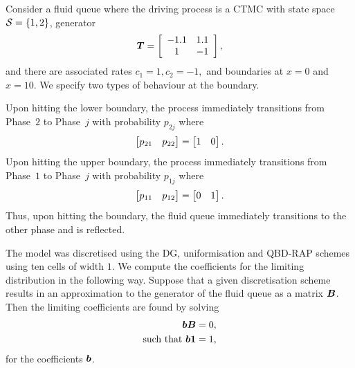 \begin{model}\label{model: simple}
	Consider a fluid queue where the driving process is a CTMC with state space \(\mathcal{S}=\{1,2\}\), generator 
	\[\boldsymbol T = \left[\begin{array}{cccc}
		-1.1 & 1.1 \\
		1 & -1 \\ 
	\end{array}\right],\]
	and there are associated rates \(c_1=1, c_2 = -1,\) and boundaries at \(x=0\) and \(x=10\). We specify two types of behaviour at the boundary.
	
	Upon hitting the lower boundary, the process immediately transitions from Phase~\(2\) to Phase~\(j\) with probability \(p_{2j}\) where 
		\[\begin{bmatrix} p_{21} & p_{22}  \end{bmatrix} = \begin{bmatrix} 1 & 0 \end{bmatrix}.\]
	Upon hitting the upper boundary, the process immediately transitions from Phase~\(1\) to Phase~\(j\) with probability \(p_{1j}\) where 
		\[\begin{bmatrix} p_{11} & p_{12}  \end{bmatrix} = \begin{bmatrix} 0 & 1 \end{bmatrix}.\]
	Thus, upon hitting the boundary, the fluid queue immediately transitions to the other phase and is reflected.
\end{model}

The model was discretised using the DG, uniformisation and QBD-RAP schemes using ten cells of width \(1\). We compute the coefficients for the limiting distribution in the following way. Suppose that a given discretisation scheme results in an approximation to the generator of the fluid queue as a matrix \(\boldsymbol B\). Then the limiting coefficients are found by solving 
\begin{align}
	\boldsymbol b \boldsymbol B = 0,\\
	\mbox{such that } \boldsymbol b\boldsymbol 1=1,
\end{align}
for the coefficients \(\boldsymbol b\). 


